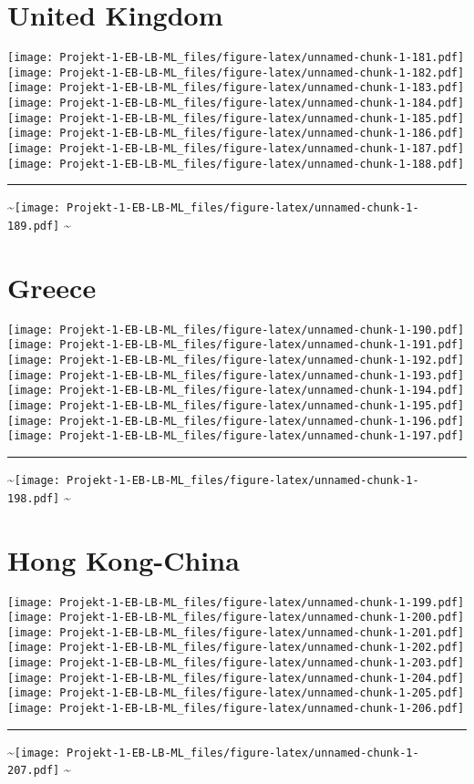 \documentclass[]{article}
\begin{document}
\section{United Kingdom}\label{united-kingdom}

\texttt{[image: Projekt-1-EB-LB-ML\_files/figure-latex/unnamed-chunk-1-181.pdf]}
\texttt{[image: Projekt-1-EB-LB-ML\_files/figure-latex/unnamed-chunk-1-182.pdf]}
\texttt{[image: Projekt-1-EB-LB-ML\_files/figure-latex/unnamed-chunk-1-183.pdf]}
\texttt{[image: Projekt-1-EB-LB-ML\_files/figure-latex/unnamed-chunk-1-184.pdf]}
\texttt{[image: Projekt-1-EB-LB-ML\_files/figure-latex/unnamed-chunk-1-185.pdf]}
\texttt{[image: Projekt-1-EB-LB-ML\_files/figure-latex/unnamed-chunk-1-186.pdf]}
\texttt{[image: Projekt-1-EB-LB-ML\_files/figure-latex/unnamed-chunk-1-187.pdf]}
\texttt{[image: Projekt-1-EB-LB-ML\_files/figure-latex/unnamed-chunk-1-188.pdf]}
\bigskip\hrule\bigskip
\textasciitilde{}\hfill\texttt{[image: Projekt-1-EB-LB-ML\_files/figure-latex/unnamed-chunk-1-189.pdf]}
\hfill \textasciitilde{} \vfill\eject

\section{Greece}\label{greece}

\texttt{[image: Projekt-1-EB-LB-ML\_files/figure-latex/unnamed-chunk-1-190.pdf]}
\texttt{[image: Projekt-1-EB-LB-ML\_files/figure-latex/unnamed-chunk-1-191.pdf]}
\texttt{[image: Projekt-1-EB-LB-ML\_files/figure-latex/unnamed-chunk-1-192.pdf]}
\texttt{[image: Projekt-1-EB-LB-ML\_files/figure-latex/unnamed-chunk-1-193.pdf]}
\texttt{[image: Projekt-1-EB-LB-ML\_files/figure-latex/unnamed-chunk-1-194.pdf]}
\texttt{[image: Projekt-1-EB-LB-ML\_files/figure-latex/unnamed-chunk-1-195.pdf]}
\texttt{[image: Projekt-1-EB-LB-ML\_files/figure-latex/unnamed-chunk-1-196.pdf]}
\texttt{[image: Projekt-1-EB-LB-ML\_files/figure-latex/unnamed-chunk-1-197.pdf]}
\bigskip\hrule\bigskip
\textasciitilde{}\hfill\texttt{[image: Projekt-1-EB-LB-ML\_files/figure-latex/unnamed-chunk-1-198.pdf]}
\hfill \textasciitilde{} \vfill\eject

\section{Hong Kong-China}\label{hong-kong-china}

\texttt{[image: Projekt-1-EB-LB-ML\_files/figure-latex/unnamed-chunk-1-199.pdf]}
\texttt{[image: Projekt-1-EB-LB-ML\_files/figure-latex/unnamed-chunk-1-200.pdf]}
\texttt{[image: Projekt-1-EB-LB-ML\_files/figure-latex/unnamed-chunk-1-201.pdf]}
\texttt{[image: Projekt-1-EB-LB-ML\_files/figure-latex/unnamed-chunk-1-202.pdf]}
\texttt{[image: Projekt-1-EB-LB-ML\_files/figure-latex/unnamed-chunk-1-203.pdf]}
\texttt{[image: Projekt-1-EB-LB-ML\_files/figure-latex/unnamed-chunk-1-204.pdf]}
\texttt{[image: Projekt-1-EB-LB-ML\_files/figure-latex/unnamed-chunk-1-205.pdf]}
\texttt{[image: Projekt-1-EB-LB-ML\_files/figure-latex/unnamed-chunk-1-206.pdf]}
\bigskip\hrule\bigskip
\textasciitilde{}\hfill\texttt{[image: Projekt-1-EB-LB-ML\_files/figure-latex/unnamed-chunk-1-207.pdf]}
\hfill \textasciitilde{} \vfill\eject
\end{document}
